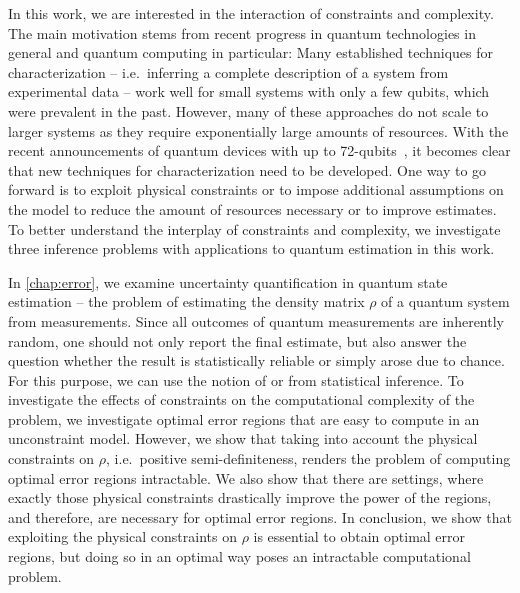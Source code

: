 In this work, we are interested in the interaction of constraints and complexity.
The main motivation stems from recent progress in quantum technologies in general and quantum computing in particular:
Many established techniques for characterization -- i.e.\ inferring a complete description of a system from experimental data -- work well for small systems with only a few qubits, which were prevalent in the past.
However, many of these approaches do not scale to larger systems as they require exponentially large amounts of resources.
With the recent announcements of quantum devices with up to 72-qubits~\cite{Sciencenews}, it becomes clear that new techniques for characterization need to be developed.
One way to go forward is to exploit physical constraints or to impose additional assumptions on the model to reduce the amount of resources necessary or to improve estimates.
To better understand the interplay of constraints and complexity, we investigate three inference problems with applications to quantum estimation in this work.

In \cref{chap:error}, we examine uncertainty quantification in quantum state estimation -- the problem of estimating the density matrix $\rho$ of a quantum system from measurements.
Since all outcomes of quantum measurements are inherently random, one should not only report the final estimate, but also answer the question whether the result is statistically reliable or simply arose due to chance.
For this purpose, we can use the notion of  or  from statistical inference.
To investigate the effects of constraints on the computational complexity of the problem, we investigate optimal error regions that are easy to compute in an unconstraint model.
However, we show that taking into account the physical constraints on $\rho$, i.e.\ positive semi-definiteness, renders the problem of computing optimal error regions intractable.
We also show that there are settings, where exactly those physical constraints drastically improve the power of the regions, and therefore, are necessary for optimal error regions.
In conclusion, we show that exploiting the physical constraints on $\rho$ is essential to obtain optimal error regions, but doing so in an optimal way poses an intractable computational problem.

